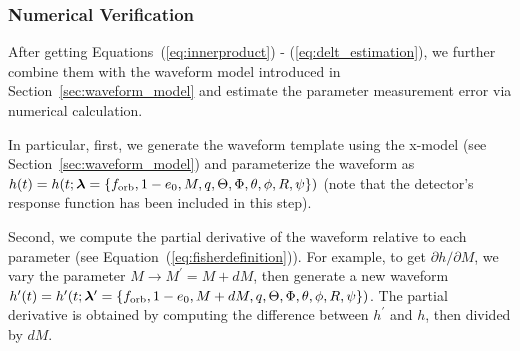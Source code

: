 \documentclass[%
 reprint,
 amsmath,amssymb,
 aps,
]{revtex4-2}
\begin{document}
%


\subsubsection{Numerical Verification}\label{subsec:fishernum}
After getting Equations~(\ref{eq:innerproduct}) - (\ref{eq:delt_estimation}), we further combine them with the waveform model introduced in Section~\ref{sec:waveform_model} and estimate the parameter measurement error via numerical calculation. 

In particular, first, we generate the waveform template using the x-model (see Section~\ref{sec:waveform_model}) and parameterize the waveform as $h(t)=h(t;\boldsymbol{\lambda}=\left\{f_{\rm orb}, 1-e_0, M, q, \Theta, \Phi, \theta,\phi, R,\psi \right\})$ (note that the detector's response function has been included in this step).

Second, we compute the partial derivative of the waveform relative to each parameter (see Equation~(\ref{eq:fisherdefinition})). For example, to get $\partial h/\partial M$, we vary the parameter $M\rightarrow M^{\prime}=M+d M$, then generate a new waveform $h^{\prime}(t)=h^{\prime}(t;\boldsymbol{\lambda}^{\prime}=\left\{f_{\rm orb}, 1-e_0, M+d M, q, \Theta, \Phi, \theta,\phi, R,\psi \right\})$. The partial derivative is obtained by computing the difference between $h^{\prime}$ and $h$, then divided by $d M$. 
\end{document}
